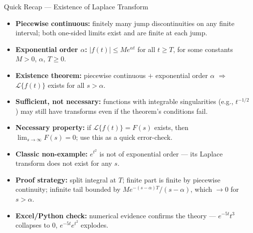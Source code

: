 \documentclass[12pt,a4paper]{article}
\begin{document}
\begin{learnbox}{Quick Recap --- Existence of Laplace Transform}
\begin{itemize}
  \item \textbf{Piecewise continuous:} finitely many jump discontinuities on any finite interval; both one-sided limits exist and are finite at each jump.
  \item \textbf{Exponential order $\alpha$:} $|f(t)| \leq M e^{\alpha t}$ for all $t \geq T$, for some constants $M > 0$, $\alpha$, $T \geq 0$.
  \item \textbf{Existence theorem:} piecewise continuous $+$ exponential order $\alpha$ $\Rightarrow$ $\mathcal{L}\{f(t)\}$ exists for all $s > \alpha$.
  \item \textbf{Sufficient, not necessary:} functions with integrable singularities (e.g., $t^{-1/2}$) may still have transforms even if the theorem's conditions fail.
  \item \textbf{Necessary property:} if $\mathcal{L}\{f(t)\} = F(s)$ exists, then $\lim_{s \to \infty} F(s) = 0$; use this as a quick error-check.
  \item \textbf{Classic non-example:} $e^{t^2}$ is not of exponential order --- its Laplace transform does not exist for any $s$.
  \item \textbf{Proof strategy:} split integral at $T$; finite part is finite by piecewise continuity; infinite tail bounded by $M e^{-(s-\alpha)T}/(s-\alpha)$, which $\to 0$ for $s > \alpha$.
  \item \textbf{Excel/Python check:} numerical evidence confirms the theory --- $e^{-5t}t^3$ collapses to 0, $e^{-5t}e^{t^2}$ explodes.
\end{itemize}
\end{learnbox}
\end{document}
